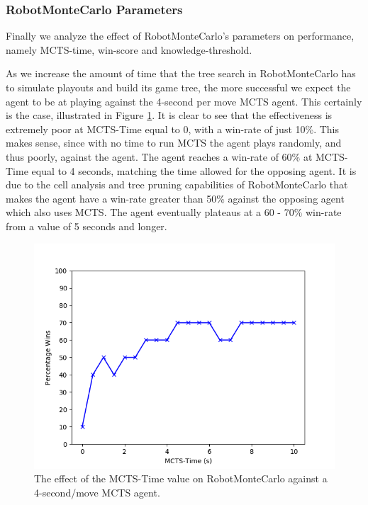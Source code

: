 \subsubsection{RobotMonteCarlo Parameters}




Finally we analyze the effect of RobotMonteCarlo's parameters on performance, namely MCTS-time, win-score and knowledge-threshold.

As we increase the amount of time that the tree search in RobotMonteCarlo has to simulate playouts and build its game tree, the more successful we expect the agent to be at playing against the 4-second per move MCTS agent. This certainly is the case, illustrated in Figure \ref{fig:mctime_perf}. It is clear to see that the effectiveness is extremely poor at MCTS-Time equal to 0, with a win-rate of just 10\%. This makes sense, since with no time to run MCTS the agent plays randomly, and thus poorly, against the agent. The agent reaches a win-rate of 60\% at MCTS-Time equal to 4 seconds, matching the time allowed for the opposing agent. It is due to the cell analysis and tree pruning capabilities of RobotMonteCarlo that makes the agent have a win-rate greater than 50\% against the opposing agent which also uses MCTS. The agent eventually plateaus at a 60 - 70\% win-rate from a value of 5 seconds and longer. 



\begin{figure}
    \centering
    \includegraphics[scale = 0.6]{images/MCTIME_PERF.png}
    \caption{The effect of the MCTS-Time value on RobotMonteCarlo against a 4-second/move MCTS agent.}
    \label{fig:mctime_perf}
\end{figure}










